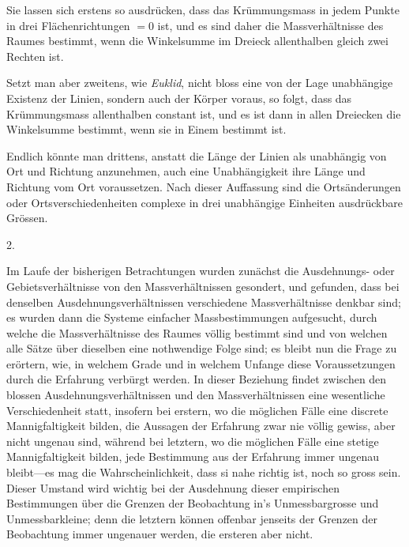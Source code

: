\documentclass[a4paper,12pt]{article}
\begin{document}
Sie lassen sich erstens so ausdr\"{u}cken, dass das
Kr\"{u}mmungsmass in jedem Punkte in drei Fl\"{a}chenrichtungen
$= 0$ ist, und es sind daher die Massverh\"{a}ltnisse des Raumes
bestimmt, wenn die Winkelsumme im Dreieck allenthalben gleich
zwei Rechten ist.

Setzt man aber zweitens, wie \emph{Euklid}, nicht bloss eine
von der Lage unabh\"{a}ngige Existenz der Linien, sondern auch
der K\"{o}rper voraus, so folgt, dass das Kr\"{u}mmungsmass
allenthalben constant ist, und es ist dann in allen Dreiecken die
Winkelsumme bestimmt, wenn sie in Einem bestimmt ist.

Endlich k\"{o}nnte man drittens, anstatt die L\"{a}nge der Linien
als unabh\"{a}ngig von Ort und Richtung anzunehmen, auch eine
Unabh\"{a}ngigkeit ihre L\"{a}nge und Richtung vom Ort
voraussetzen.  Nach dieser Auffassung sind die Orts\"{a}nderungen
oder Ortsverschiedenheiten complexe in drei unabh\"{a}ngige
Einheiten ausdr\"{u}ckbare Gr\"{o}ssen.

\medbreak

\centerline{2.}

\nobreak\medskip

Im Laufe der bisherigen Betrachtungen wurden zun\"{a}chst die
Aus\-dehn\-ungs- oder Gebietsverh\"{a}ltnisse von den
Massverh\"{a}ltnissen gesondert, und gefunden, dass bei denselben
Ausdehnungsverh\"{a}ltnissen verschiedene Massverh\"{a}ltnisse
denkbar sind; es wurden dann die Systeme einfacher
Massbestimmungen aufgesucht, durch welche die
Massverh\"{a}ltnisse des Raumes v\"{o}llig bestimmt sind und von
welchen alle S\"{a}tze \"{u}ber dieselben eine nothwendige Folge
sind; es bleibt nun die Frage zu er\"{o}rtern, wie, in welchem
Grade und in welchem Unfange diese Voraussetzungen durch die
Erfahrung verb\"{u}rgt werden.  In dieser Beziehung findet
zwischen den blossen Ausdehnungsverh\"{a}ltnissen und den
Massverh\"{a}ltnissen eine wesentliche Verschiedenheit statt,
insofern bei erstern, wo die m\"{o}glichen F\"{a}lle eine
discrete Mannigfaltigkeit bilden, die Aussagen der Erfahrung zwar
nie v\"{o}llig gewiss, aber nicht ungenau sind, w\"{a}hrend bei
letztern, wo die m\"{o}glichen F\"{a}lle eine stetige
Mannigfaltigkeit bilden, jede Bestimmung aus der Erfahrung immer
ungenau bleibt---es mag die Wahrscheinlichkeit, dass si nahe
richtig ist, noch so gross sein.  Dieser Umstand wird wichtig bei
der Ausdehnung dieser empirischen Bestimmungen \"{u}ber die
Grenzen der Beobachtung in's Unmessbargrosse und Unmessbarkleine;
denn die letztern k\"{o}nnen offenbar jenseits der Grenzen der
Beobachtung immer ungenauer werden, die ersteren aber nicht.
\end{document}
